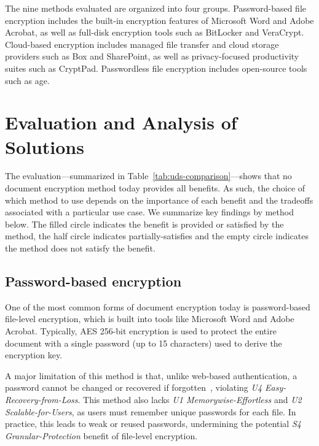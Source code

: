 The nine methods evaluated are organized into four groups. Password-based file encryption includes the built-in encryption features of Microsoft Word and Adobe Acrobat, as well as full-disk encryption tools such as BitLocker\textregistered{} and VeraCrypt. Cloud-based encryption includes managed file transfer and cloud storage providers such as Box\textregistered{} and SharePoint\textregistered{}, as well as privacy-focused productivity suites such as CryptPad. Passwordless file encryption includes open-source tools such as age.




\section{Evaluation and Analysis of Solutions}
\label{sec:uds-eval-analysis}

The evaluation---summarized in Table~\ref{tab:uds-comparison}---shows that no document encryption method today provides all benefits. As such, the choice of which method to use depends on the importance of each benefit and the tradeoffs associated with a particular use case. We summarize key findings by method below. The filled circle indicates the benefit is provided or satisfied by the method, the half circle indicates partially-satisfies and the empty circle indicates the method does not satisfy the benefit.

\subsection{Password-based encryption}
\label{sec:eval-password}

One of the most common forms of document encryption today is password-based file-level encryption, which is built into tools like Microsoft Word and Adobe Acrobat. Typically, AES 256-bit encryption is used to protect the entire document with a single password (up to 15 characters) used to derive the encryption key.

A major limitation of this method is that, unlike web-based authentication, a password cannot be changed or recovered if forgotten~\cite{microsoft_forgot_password}, violating \emph{U4 Easy-Recovery-from-Loss}. This method also lacks \emph{U1 Memorywise-Effortless} and \emph{U2 Scalable-for-Users}, as users must remember unique passwords for each file. In practice, this leads to weak or reused passwords, undermining the potential \emph{S4 Granular-Protection} benefit of file-level encryption.

